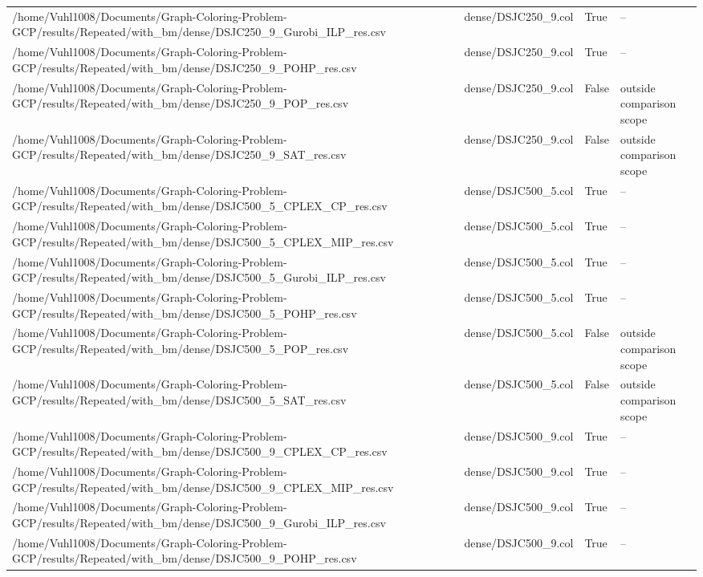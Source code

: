 \begin{table}[htbp]
\begin{tabular}{llll}
/home/Vuhl1008/Documents/Graph-Coloring-Problem-GCP/results/Repeated/with\_bm/dense/DSJC250\_9\_Gurobi\_ILP\_res.csv & dense/DSJC250\_9.col & True & -- \\
/home/Vuhl1008/Documents/Graph-Coloring-Problem-GCP/results/Repeated/with\_bm/dense/DSJC250\_9\_POHP\_res.csv & dense/DSJC250\_9.col & True & -- \\
/home/Vuhl1008/Documents/Graph-Coloring-Problem-GCP/results/Repeated/with\_bm/dense/DSJC250\_9\_POP\_res.csv & dense/DSJC250\_9.col & False & outside comparison scope \\
/home/Vuhl1008/Documents/Graph-Coloring-Problem-GCP/results/Repeated/with\_bm/dense/DSJC250\_9\_SAT\_res.csv & dense/DSJC250\_9.col & False & outside comparison scope \\
/home/Vuhl1008/Documents/Graph-Coloring-Problem-GCP/results/Repeated/with\_bm/dense/DSJC500\_5\_CPLEX\_CP\_res.csv & dense/DSJC500\_5.col & True & -- \\
/home/Vuhl1008/Documents/Graph-Coloring-Problem-GCP/results/Repeated/with\_bm/dense/DSJC500\_5\_CPLEX\_MIP\_res.csv & dense/DSJC500\_5.col & True & -- \\
/home/Vuhl1008/Documents/Graph-Coloring-Problem-GCP/results/Repeated/with\_bm/dense/DSJC500\_5\_Gurobi\_ILP\_res.csv & dense/DSJC500\_5.col & True & -- \\
/home/Vuhl1008/Documents/Graph-Coloring-Problem-GCP/results/Repeated/with\_bm/dense/DSJC500\_5\_POHP\_res.csv & dense/DSJC500\_5.col & True & -- \\
/home/Vuhl1008/Documents/Graph-Coloring-Problem-GCP/results/Repeated/with\_bm/dense/DSJC500\_5\_POP\_res.csv & dense/DSJC500\_5.col & False & outside comparison scope \\
/home/Vuhl1008/Documents/Graph-Coloring-Problem-GCP/results/Repeated/with\_bm/dense/DSJC500\_5\_SAT\_res.csv & dense/DSJC500\_5.col & False & outside comparison scope \\
/home/Vuhl1008/Documents/Graph-Coloring-Problem-GCP/results/Repeated/with\_bm/dense/DSJC500\_9\_CPLEX\_CP\_res.csv & dense/DSJC500\_9.col & True & -- \\
/home/Vuhl1008/Documents/Graph-Coloring-Problem-GCP/results/Repeated/with\_bm/dense/DSJC500\_9\_CPLEX\_MIP\_res.csv & dense/DSJC500\_9.col & True & -- \\
/home/Vuhl1008/Documents/Graph-Coloring-Problem-GCP/results/Repeated/with\_bm/dense/DSJC500\_9\_Gurobi\_ILP\_res.csv & dense/DSJC500\_9.col & True & -- \\
/home/Vuhl1008/Documents/Graph-Coloring-Problem-GCP/results/Repeated/with\_bm/dense/DSJC500\_9\_POHP\_res.csv & dense/DSJC500\_9.col & True & -- \\

\end{tabular}
\end{table}
